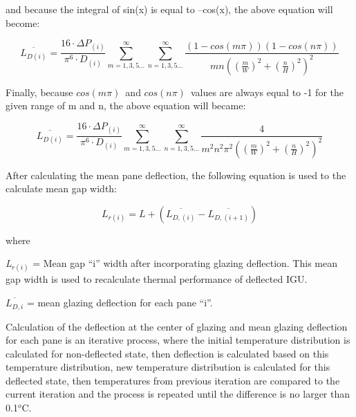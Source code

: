 and because the integral of sin(x) is equal to --cos(x), the above equation will become:

\begin{equation}
\overline {{L_{D\left( i \right)}}}  = \frac{{16\cdot \Delta {P_{\left( i \right)}}}}{{{\pi ^6}\cdot {D_{\left( i \right)}}}}\mathop \sum \limits_{m = 1,3,5 \ldots }^\infty  \mathop \sum \limits_{n = 1,3,5 \ldots }^\infty  \frac{{\left( {1 - cos\left( {m\pi } \right)} \right)\left( {1 - cos\left( {n\pi } \right)} \right)}}{{mn{{\left( {{{\left( {\frac{m}{W}} \right)}^2} + {{\left( {\frac{n}{H}} \right)}^2}} \right)}^2}}}
\end{equation}

Finally, because \(cos\left( {m\pi } \right)\)~and \(cos\left( {n\pi } \right)\)~values are always equal to -1 for the given range of m and n, the above equation will became:

\begin{equation}
\overline {{L_{D\left( i \right)}}}  = \frac{{16\cdot \Delta {P_{\left( i \right)}}}}{{{\pi ^6}\cdot {D_{\left( i \right)}}}}\mathop \sum \limits_{m = 1,3,5 \ldots }^\infty  \mathop \sum \limits_{n = 1,3,5 \ldots }^\infty  \frac{4}{{{m^2}{n^2}{\pi ^2}{{\left( {{{\left( {\frac{m}{W}} \right)}^2} + {{\left( {\frac{n}{H}} \right)}^2}} \right)}^2}}}
\end{equation}

After calculating the mean pane deflection, the following equation is used to the calculate mean gap width:

\begin{equation}
{L_{r\left( i \right)}} = L + \left( {\overline {{L_{D,\left( i \right)}}}  - \overline {{L_{D,\left( {i + 1} \right)}}} } \right)
\label{eq:IGUMeanPaneDeflection}
\end{equation}

where

\emph{L\(_{r(i)}\)} = Mean gap ``i'' width after incorporating glazing deflection. This mean gap width is used to recalculate thermal performance of deflected IGU.

\(\overline {{L_{D,i}}}\) = mean glazing deflection for each pane ``i''.

Calculation of the deflection at the center of glazing and mean glazing deflection for each pane is an iterative process, where the initial temperature distribution is calculated for non-deflected state, then deflection is calculated based on this temperature distribution, new temperature distribution is calculated for this deflected state, then temperatures from previous iteration are compared to the current iteration and the process is repeated until the difference is no larger than 0.1\(^{o}\)C.

